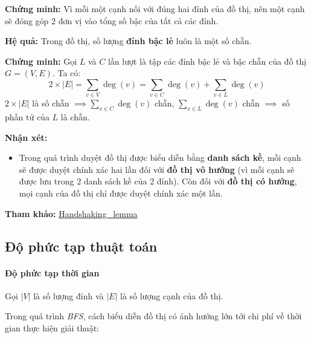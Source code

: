 \textbf{Chứng minh:}  
Vì mỗi một cạnh nối với đúng hai đỉnh của đồ thị, nên một cạnh sẽ đóng góp $2$ đơn vị vào tổng số bậc của tất cả các đỉnh.

\textbf{Hệ quả:} Trong đồ thị, số lượng \textbf{đỉnh bậc lẻ} luôn là một số chẵn.

\textbf{Chứng minh:} Gọi $L$ và $C$ lần lượt là tập các đỉnh bậc lẻ và bậc chẵn của đồ thị $G=(V,E)$. Ta có:
\[
2 \times |E| = \sum_{v \in V} \deg(v) = \sum_{v \in C} \deg(v) + \sum_{v \in L} \deg(v)
\]
$2 \times |E|$ là số chẵn $\implies \sum_{v \in C} \deg(v)$ chẵn, $\sum_{v \in L} \deg(v)$ chẵn $\implies$ số phần tử của $L$ là chẵn.

\textbf{Nhận xét:}
\begin{itemize}
    \item Trong quá trình duyệt đồ thị được biểu diễn bằng \textbf{danh sách kề}, mỗi cạnh sẽ được duyệt chính xác hai lần đối với \textbf{đồ thị vô hướng} (vì mỗi cạnh sẽ được lưu trong 2 danh sách kề của 2 đỉnh). Còn đối với \textbf{đồ thị có hướng}, mọi cạnh của đồ thị chỉ được duyệt chính xác một lần.
\end{itemize}

\textbf{Tham khảo:} \href{https://en.wikipedia.org/wiki/Handshaking_lemma}{Handshaking\_lemma}

\subsection{Độ phức tạp thuật toán}

\paragraph{Độ phức tạp thời gian}

Gọi $|V|$ là số lượng đỉnh và $|E|$ là số lượng cạnh của đồ thị.

Trong quá trình \textit{BFS}, cách biểu diễn đồ thị có ảnh hưởng lớn tới chi phí về thời gian thực hiện giải thuật:

